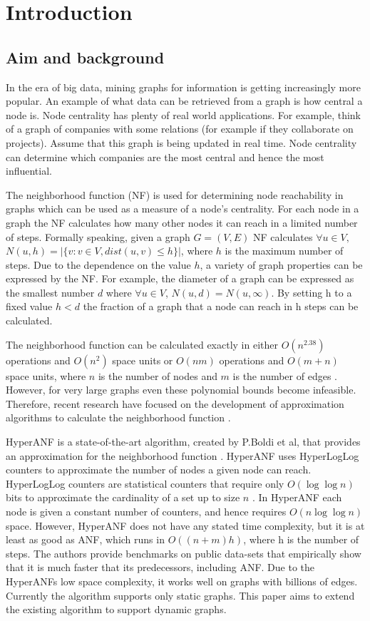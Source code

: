 \chapter{Introduction}

\section{Aim and background}
In the era of big data, mining graphs for information is getting increasingly more popular. An example of what data can be retrieved from a graph is how central a node is. Node centrality has plenty of real world applications. For example, think of a graph of companies with some relations (for example if they collaborate on projects). Assume that this graph is being updated in real time. Node centrality can determine which companies are the most central and hence the most influential. 

The neighborhood function (NF) is used for determining node reachability in graphs which can be used as a measure of a node's centrality. For each node in a graph the NF calculates how many other nodes it can reach in a limited number of steps. Formally speaking, given a graph $G = (V,E)$ NF calculates $\forall u \in V,$ $N(u,h) = |\{v : v \in V, dist(u,v) \leq h \}|$, where $h$ is the maximum number of steps. Due to the dependence on the value $h$, a variety of graph properties can be expressed by the NF. For example, the diameter of a graph can be expressed as the smallest number $d$ where $ \forall u \in V$, $N(u,d) = N(u,\infty)$. By setting h to a fixed value $h < d$ the fraction of a graph that a node can reach in h steps can be calculated.

The neighborhood function can be calculated exactly in either $O(n^{2.38})$ operations and $O(n^2)$ space units or $O(nm)$ operations and $O(m + n)$ space units, where $n$ is the number of nodes and $m$ is the number of edges \cite{Palmer01}. However, for very large graphs even these polynomial bounds become infeasible. Therefore, recent research have focused on the development of approximation algorithms to calculate the neighborhood function \cite{hyperanf,Palmer01,anf}. 

HyperANF is a state-of-the-art algorithm, created by P.Boldi et al, that provides an approximation for the neighborhood function \cite{hyperanf}. HyperANF uses HyperLogLog counters to approximate the number of nodes a given node can reach. HyperLogLog counters are statistical counters that require only $O( \log\log n)$ bits to approximate the cardinality of a set up to size $n$ \cite{hyperloglog}. In HyperANF each node is given a constant number of counters, and hence requires $O(n \log\log n)$ space. However, HyperANF does not have any stated time complexity, but it is at least as good as ANF, which runs in $O((n+m)h)$, where h is the number of steps. The authors provide benchmarks on public data-sets that empirically show that it is much faster that its predecessors, including ANF. Due to the HyperANFs low space complexity, it works well on graphs with billions of edges. Currently the algorithm supports only static graphs. This paper aims to extend the existing algorithm to support dynamic graphs.

